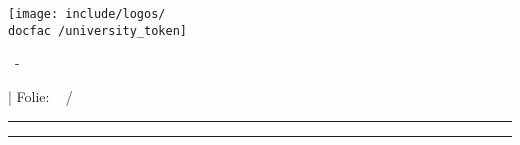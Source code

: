 {
	\hspace*{0.02\textwidth}
	\begin{minipage}[m]{0.3\textwidth}
		\vspace*{3ex}
		\texttt{[image: include/logos/\\docfac /university\_token]}
	\end{minipage}
	\begin{minipage}[m]{0.45\textwidth}
		\vspace*{3ex}
		\doctitle ~- \docsubtitle
	\end{minipage}
	\hfill
	\begin{minipage}[m]{0.14\textwidth}
		\vspace*{3ex}
		| Folie: \hfill \insertframenumber ~ / \inserttotalframenumber
		\hspace*{0.1\textwidth}
	\end{minipage}
	\color{\docfac }
	\rule{\paperwidth}{1pt}
}
%
%
%
{
	\color{\docfac }
	\rule{\paperwidth}{1pt}
	\color{black}
	\begin{minipage}[c]{\textwidth}
		\vspace*{1ex}
		\hspace*{0.02\textwidth} \docauthor \hfill \docdate \hspace{0.02\textwidth}
		\vspace*{2ex}
	\end{minipage}
}